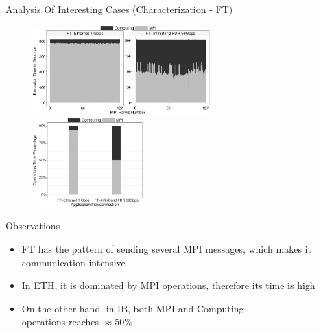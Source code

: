 \documentclass{beamer}
\begin{document}
\begin{frame}{Analysis Of Interesting Cases (Characterization - FT)}
\begin{figure}
   \includegraphics[width=0.61\textwidth]{SLIDES/img/FT.charac.pdf}
   \includegraphics[width=0.38\textwidth]{SLIDES/img/FT.percentage.pdf}
\end{figure}
Observations
\begin{itemize}
    \pause \item FT has the pattern of sending several MPI messages, which makes it communication intensive
    \pause \item In ETH, it is dominated by MPI operations, therefore its time is high
    \pause \item On the other hand, in IB, both MPI and Computing \\operations reaches $\approx$50\%
\end{itemize}
\end{frame}
\end{document}
